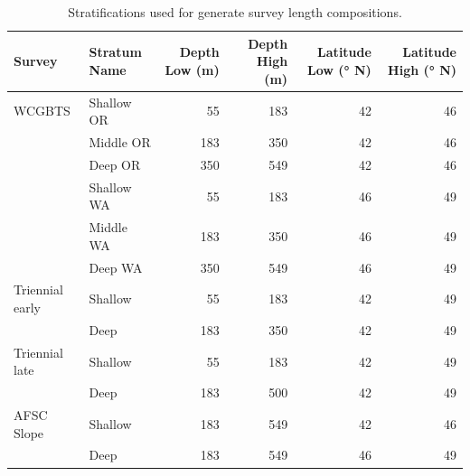 \documentclass[
]{scrartcl}
\begin{document}
\begin{longtable}{llrrrr}

\caption{\label{tbl-survey_strata}Stratifications used for generate
survey length compositions.}

\tabularnewline

\toprule
Survey & Stratum Name & Depth Low (m) & Depth High (m) & Latitude Low (° N) & Latitude High (° N) \\ 
\midrule\addlinespace[2.5pt]
WCGBTS & Shallow OR & 55 & 183 & 42 & 46 \\ 
 & Middle OR & 183 & 350 & 42 & 46 \\ 
 & Deep OR & 350 & 549 & 42 & 46 \\ 
 & Shallow WA & 55 & 183 & 46 & 49 \\ 
 & Middle WA & 183 & 350 & 46 & 49 \\ 
 & Deep WA & 350 & 549 & 46 & 49 \\ 
Triennial early & Shallow & 55 & 183 & 42 & 49 \\ 
 & Deep & 183 & 350 & 42 & 49 \\ 
Triennial late & Shallow & 55 & 183 & 42 & 49 \\ 
 & Deep & 183 & 500 & 42 & 49 \\ 
AFSC Slope & Shallow & 183 & 549 & 42 & 46 \\ 
 & Deep & 183 & 549 & 46 & 49 \\ 
\bottomrule

\end{longtable}

\endgroup

\newpage{}

\begingroup
\fontsize{9.0pt}{10.8pt}\selectfont
\end{document}
